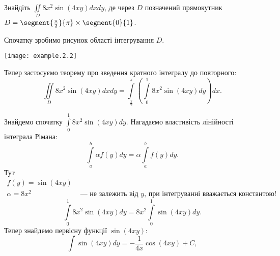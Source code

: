 \begin{example}
Знайдіть ${\iint\limits_{D}8 x^2 \sin\left(4 x y\right)d x d y}$, де через $D$ позначений пря\-мо\-кут\-ник ${D = \segment{\frac{\pi}{2}}{\pi}\times\segment{0}{1}}$.

Спочатку зробимо рисунок області інтегрування $D$.

\texttt{[image: example.2.2]}

Тепер застосуємо теорему про зведення кратного інтегралу до повторного:
\[
\iint\limits_{D}8 x^2 \sin(4 x y)d x d y = \int\limits_{\frac{\pi}{2}}^{\pi}\left(\int\limits_{0}^{1}8 x^2 \sin\left(4 x y\right)d y\right)dx.
\]

Знайдемо спочатку $\int\limits_{0}^{1}8 x^2 \sin\left(4 x y\right)d y$. Нагадаємо властивість лінійності інтеграла Рімана:
\[
\int\limits_{a}^{b}\alpha f(y) d y = \alpha \int\limits_{a}^{b}f(y)d y.
\]
Тут
\[
\begin{array}{cc}
f(y) =  \sin\left(4 x y\right) & \\
\alpha = 8 x^2  & \mbox{ --- не залежить від } y\mbox{, при інтегруванні вважається константою!}
\end{array}
\]
\[
\int\limits_{0}^{1}8 x^2 \sin\left(4 x y\right)d y = 8 x^2 \int\limits_{0}^{1} \sin\left(4 x y\right)d y.
\]
Тепер знайдемо первісну функції ${\sin\left(4 x y\right)}$:
\[
\int\limits \sin\left(4 x y\right)d y = -\frac{1}{4 x}\cos\left(4 x y\right) + C,
\]


\end{example}
